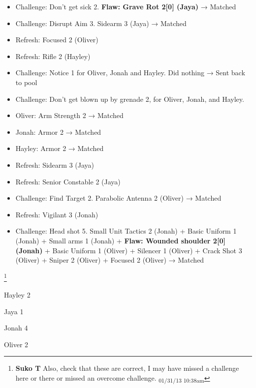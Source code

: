 {\begin{itemize}
\item Challenge: Don't get sick 2. \textbf{ {\color[RGB]{255,0,0}Flaw: Grave Rot 2{[}0{]} (Jaya)} } → Matched
\item Challenge: Disrupt Aim 3. Sidearm 3 (Jaya) → Matched
\item Refresh: Focused 2 (Oliver)
\item Refresh: Rifle 2 (Hayley)
\item Challenge: Notice 1 for Oliver, Jonah and Hayley. Did nothing → Sent back to pool
\item Challenge: Don't get blown up by grenade 2, for Oliver, Jonah, and Hayley.  
\end{itemize}

\begin{itemize}
\item Oliver: Arm Strength 2 → Matched
\item Jonah: Armor 2 → Matched
\item Hayley: Armor 2 → Matched
\end{itemize}

\begin{itemize}
\item Refresh: Sidearm 3 (Jaya)
\item Refresh: Senior Constable 2 (Jaya)
\item Challenge: Find Target 2.  Parabolic Antenna 2 (Oliver) → Matched
\item Refresh: Vigilant 3 (Jonah)
\item Challenge: Head shot 5.  Small Unit Tactics 2 (Jonah) + Basic Uniform 1 (Jonah) + Small arms 1 (Jonah) + \textbf{ {\color[RGB]{255,0,0}Flaw: Wounded shoulder 2{[}0{]} (Jonah)} } + Basic Uniform 1 (Oliver) + Silencer 1 (Oliver) + Crack Shot 3 (Oliver) + Sniper 2 (Oliver) + Focused 2 (Oliver) → Matched
\end{itemize}

}



 \footnote{\textbf{Suko T }Also, check that these are correct, I may have missed a challenge here or there or missed an overcome challenge. \textsubscript{01/31/13 10:38am}}

{
\parskip=0pt
Hayley 2

Jaya 1

Jonah 4

Oliver 2
}
\newpage



